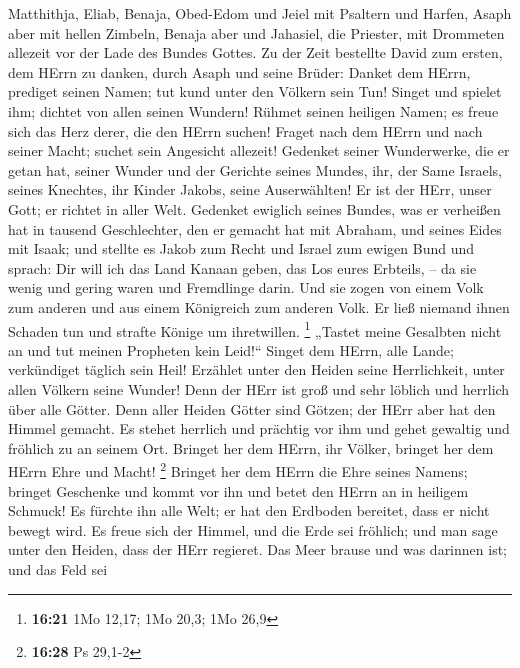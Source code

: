 Matthithja, Eliab, Benaja, Obed-Edom und Jeiel mit Psaltern und Harfen,
Asaph aber mit hellen Zimbeln,  Benaja aber und Jahasiel,
die Priester, mit Drommeten allezeit vor der Lade des Bundes Gottes.
 Zu der Zeit bestellte David zum ersten, dem HErrn zu
danken, durch Asaph und seine Brüder:  Danket dem HErrn,
prediget seinen Namen; tut kund unter den Völkern sein Tun! 
Singet und spielet ihm; dichtet von allen seinen Wundern! 
Rühmet seinen heiligen Namen; es freue sich das Herz derer, die den
HErrn suchen!  Fraget nach dem HErrn und nach seiner Macht;
suchet sein Angesicht allezeit!  Gedenket seiner
Wunderwerke, die er getan hat, seiner Wunder und der Gerichte seines
Mundes,  ihr, der Same Israels, seines Knechtes, ihr Kinder
Jakobs, seine Auserwählten!  Er ist der HErr, unser Gott;
er richtet in aller Welt.  Gedenket ewiglich seines Bundes,
was er verheißen hat in tausend Geschlechter,  den er
gemacht hat mit Abraham, und seines Eides mit Isaak;  und
stellte es Jakob zum Recht und Israel zum ewigen Bund  und
sprach: Dir will ich das Land Kanaan geben, das Los eures Erbteils, --
 da sie wenig und gering waren und Fremdlinge darin.
 Und sie zogen von einem Volk zum anderen und aus einem
Königreich zum anderen Volk.  Er ließ niemand ihnen Schaden
tun und strafte Könige um ihretwillen. \footnote{\textbf{16:21} 1Mo
  12,17; 1Mo 20,3; 1Mo 26,9}  „Tastet meine Gesalbten nicht
an und tut meinen Propheten kein Leid!{}``  Singet dem
HErrn, alle Lande; verkündiget täglich sein Heil!  Erzählet
unter den Heiden seine Herrlichkeit, unter allen Völkern seine Wunder!
 Denn der HErr ist groß und sehr löblich und herrlich über
alle Götter.  Denn aller Heiden Götter sind Götzen; der
HErr aber hat den Himmel gemacht.  Es stehet herrlich und
prächtig vor ihm und gehet gewaltig und fröhlich zu an seinem Ort.
 Bringet her dem HErrn, ihr Völker, bringet her dem HErrn
Ehre und Macht! \footnote{\textbf{16:28} Ps 29,1-2} 
Bringet her dem HErrn die Ehre seines Namens; bringet Geschenke und
kommt vor ihn und betet den HErrn an in heiligem Schmuck! 
Es fürchte ihn alle Welt; er hat den Erdboden bereitet, dass er nicht
bewegt wird.  Es freue sich der Himmel, und die Erde sei
fröhlich; und man sage unter den Heiden, dass der HErr regieret.
 Das Meer brause und was darinnen ist; und das Feld sei
